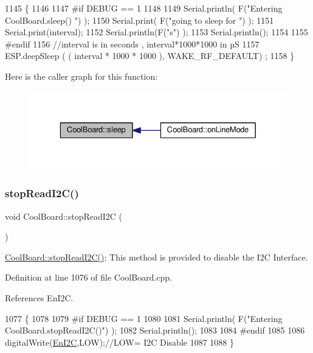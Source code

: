 \begin{DoxyCode}
1145 \{
1146 
1147 \textcolor{preprocessor}{#if DEBUG == 1}
1148 
1149     Serial.println( F(\textcolor{stringliteral}{"Entering CoolBoard.sleep() "}) );
1150     Serial.print( F(\textcolor{stringliteral}{"going to sleep for "}) );
1151     Serial.print(interval);
1152     Serial.println(F(\textcolor{stringliteral}{"s"}) );
1153     Serial.println();
1154 
1155 \textcolor{preprocessor}{#endif}
1156     \textcolor{comment}{//interval is in seconds , interval*1000*1000 in µS}
1157     ESP.deepSleep ( ( interval * 1000 * 1000 ), WAKE\_RF\_DEFAULT) ;
1158 \}
\end{DoxyCode}
Here is the caller graph for this function\+:
\nopagebreak
\begin{figure}[H]
\begin{center}
\leavevmode
\includegraphics[width=329pt]{classCoolBoard_a069952cdcb2e7f68518aa429eceadb6e_icgraph}
\end{center}
\end{figure}
\mbox{\label{classCoolBoard_a8c23a7683ae929ec89d326ae605a41aa}} 
\subsubsection{\texorpdfstring{stop\+Read\+I2\+C()}{stopReadI2C()}}
{\footnotesize\ttfamily void Cool\+Board\+::stop\+Read\+I2C (\begin{DoxyParamCaption}{ }\end{DoxyParamCaption})}

\hyperlink{classCoolBoard_a8c23a7683ae929ec89d326ae605a41aa}{Cool\+Board\+::stop\+Read\+I2\+C()}\+: This method is provided to disable the I2C Interface. 

Definition at line 1076 of file Cool\+Board.\+cpp.



References En\+I2C.


\begin{DoxyCode}
1077 \{
1078 
1079 \textcolor{preprocessor}{#if DEBUG == 1}
1080 
1081     Serial.println( F(\textcolor{stringliteral}{"Entering CoolBoard.stopReadI2C()"}) );
1082     Serial.println();
1083 
1084 \textcolor{preprocessor}{#endif}
1085 
1086     digitalWrite(\hyperlink{classCoolBoard_af1fe1376fc66f93dee80b327ca695377}{EnI2C},LOW);\textcolor{comment}{//LOW= I2C Disable}
1087 
1088 \}
\end{DoxyCode}
\mbox{\label{classCoolBoard_a8612756d3f73198cdde857a66f0fe690}} 
